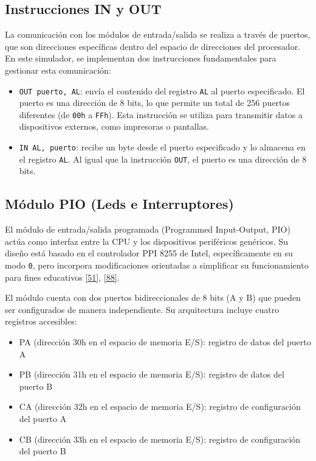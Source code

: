 \documentclass[12pt,oneside]{templates/unerthesis}
\providecommand{\tightlist}{%
  \setlength{\itemsep}{0pt}\setlength{\parskip}{0pt}}
\begin{document}
\hypertarget{instrucciones-in-y-out}{%
\subsection{Instrucciones IN y OUT}\label{instrucciones-in-y-out}}

La comunicación con los módulos de entrada/salida se realiza a través de puertos, que son direcciones específicas dentro del espacio de direcciones del procesador. En este simulador, se implementan dos instrucciones fundamentales para gestionar esta comunicación:

\begin{itemize}
\tightlist
\item
  \texttt{OUT\ puerto,\ AL}: envía el contenido del registro \texttt{AL} al puerto especificado. El puerto es una dirección de 8 bits, lo que permite un total de 256 puertos diferentes (de \texttt{00h} a \texttt{FFh}). Esta instrucción se utiliza para transmitir datos a dispositivos externos, como impresoras o pantallas.
\item
  \texttt{IN\ AL,\ puerto}: recibe un byte desde el puerto especificado y lo almacena en el registro \texttt{AL}. Al igual que la instrucción \texttt{OUT}, el puerto es una dirección de 8 bits.
\end{itemize}

\hypertarget{muxf3dulo-pio-leds-e-interruptores}{%
\subsection{Módulo PIO (Leds e Interruptores)}\label{muxf3dulo-pio-leds-e-interruptores}}

El módulo de entrada/salida programada (Programmed Input-Output, PIO) actúa como interfaz entre la CPU y los dispositivos periféricos genéricos. Su diseño está basado en el controlador PPI 8255 de Intel, específicamente en su modo \texttt{0}, pero incorpora modificaciones orientadas a simplificar su funcionamiento para fines educativos \protect\hyperlink{ref-intel8086manual}{{[}51{]}}, \protect\hyperlink{ref-godse2020microprocessor}{{[}88{]}}.

El módulo cuenta con dos puertos bidireccionales de 8 bits (A y B) que pueden ser configurados de manera independiente. Su arquitectura incluye cuatro registros accesibles:

\begin{itemize}
\tightlist
\item
  PA (dirección 30h en el espacio de memoria E/S): registro de datos del puerto A
\item
  PB (dirección 31h en el espacio de memoria E/S): registro de datos del puerto B
\item
  CA (dirección 32h en el espacio de memoria E/S): registro de configuración del puerto A
\item
  CB (dirección 33h en el espacio de memoria E/S): registro de configuración del puerto B
\end{itemize}
\end{document}
